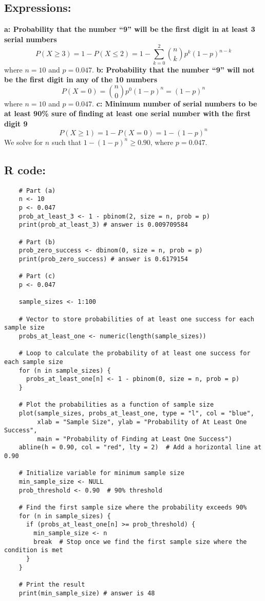 \documentclass{article}
\begin{document}
\subsection{Expressions:}
\textbf{a: Probability that the number “9” will be the first digit in at least 3 serial numbers}
\[
P(X \geq 3) = 1 - P(X \leq 2) = 1 - \sum_{k=0}^{2} \binom{n}{k} p^k (1 - p)^{n - k}
\]
where \( n = 10 \) and \( p = 0.047 \).
\newline
\newline
\textbf{b: Probability that the number “9” will not be the first digit in any of the 10 numbers}
\[
P(X = 0) = \binom{n}{0} p^0 (1 - p)^{n} = (1 - p)^{n}
\]
where \( n = 10 \) and \( p = 0.047 \).
\newline
\newline
\textbf{c: Minimum number of serial numbers to be at least 90\% sure of finding at least one serial number with the first digit 9}
\[
P(X \geq 1) = 1 - P(X = 0) = 1 - (1 - p)^n
\]
We solve for \( n \) such that \( 1 - (1 - p)^n \geq 0.90 \), where \( p = 0.047 \).

\subsection{R code:}
\begin{lstlisting}
    # Part (a)
    n <- 10
    p <- 0.047
    prob_at_least_3 <- 1 - pbinom(2, size = n, prob = p)
    print(prob_at_least_3) # answer is 0.009709584
    
    # Part (b)
    prob_zero_success <- dbinom(0, size = n, prob = p)
    print(prob_zero_success) # answer is 0.6179154
    
    # Part (c)
    p <- 0.047
    
    sample_sizes <- 1:100
    
    # Vector to store probabilities of at least one success for each sample size
    probs_at_least_one <- numeric(length(sample_sizes))
    
    # Loop to calculate the probability of at least one success for each sample size
    for (n in sample_sizes) {
      probs_at_least_one[n] <- 1 - pbinom(0, size = n, prob = p)
    }
    
    # Plot the probabilities as a function of sample size
    plot(sample_sizes, probs_at_least_one, type = "l", col = "blue", 
         xlab = "Sample Size", ylab = "Probability of At Least One Success", 
         main = "Probability of Finding at Least One Success")
    abline(h = 0.90, col = "red", lty = 2)  # Add a horizontal line at 0.90
    
    # Initialize variable for minimum sample size
    min_sample_size <- NULL
    prob_threshold <- 0.90  # 90% threshold
    
    # Find the first sample size where the probability exceeds 90%
    for (n in sample_sizes) {
      if (probs_at_least_one[n] >= prob_threshold) {
        min_sample_size <- n
        break  # Stop once we find the first sample size where the condition is met
      }
    }
    
    # Print the result
    print(min_sample_size) # answer is 48    
    \end{lstlisting}
\end{document}
